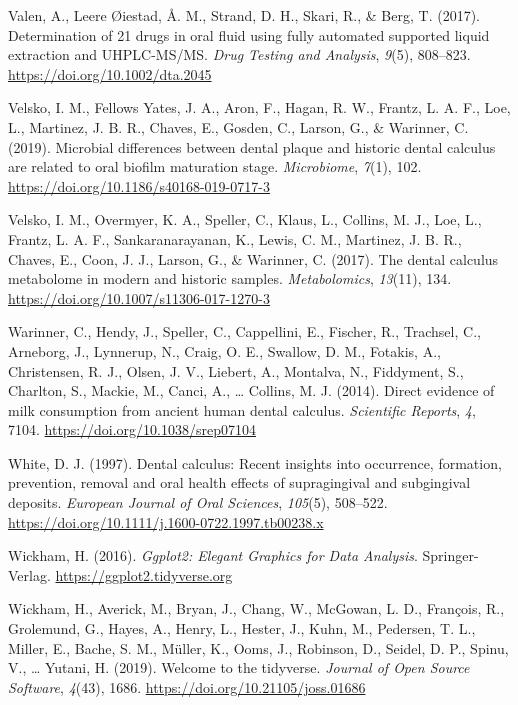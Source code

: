 \documentclass[
  11pt,
  leqno]{scrartcl}
\newlength{\cslhangindent}
\newenvironment{CSLReferences}[2] %
 {\begin{list}{}{%
  \setlength{\itemindent}{0pt}
  \setlength{\leftmargin}{0pt}
  \setlength{\parsep}{0pt}
  \ifodd #1
   \setlength{\leftmargin}{\cslhangindent}
   \setlength{\itemindent}{-1\cslhangindent}
  \fi
  \setlength{\itemsep}{#2\baselineskip}}}
 {\end{list}}
\begin{document}
\begin{CSLReferences}{1}{0}
Valen, A., Leere Øiestad, Å. M., Strand, D. H., Skari, R., \& Berg, T.
(2017). Determination of 21 drugs in oral fluid using fully automated
supported liquid extraction and {UHPLC-MS}/{MS}. \emph{Drug Testing and
Analysis}, \emph{9}(5), 808--823. \url{https://doi.org/10.1002/dta.2045}

Velsko, I. M., Fellows Yates, J. A., Aron, F., Hagan, R. W., Frantz, L.
A. F., Loe, L., Martinez, J. B. R., Chaves, E., Gosden, C., Larson, G.,
\& Warinner, C. (2019). Microbial differences between dental plaque and
historic dental calculus are related to oral biofilm maturation stage.
\emph{Microbiome}, \emph{7}(1), 102.
\url{https://doi.org/10.1186/s40168-019-0717-3}

Velsko, I. M., Overmyer, K. A., Speller, C., Klaus, L., Collins, M. J.,
Loe, L., Frantz, L. A. F., Sankaranarayanan, K., Lewis, C. M., Martinez,
J. B. R., Chaves, E., Coon, J. J., Larson, G., \& Warinner, C. (2017).
The dental calculus metabolome in modern and historic samples.
\emph{Metabolomics}, \emph{13}(11), 134.
\url{https://doi.org/10.1007/s11306-017-1270-3}

Warinner, C., Hendy, J., Speller, C., Cappellini, E., Fischer, R.,
Trachsel, C., Arneborg, J., Lynnerup, N., Craig, O. E., Swallow, D. M.,
Fotakis, A., Christensen, R. J., Olsen, J. V., Liebert, A., Montalva,
N., Fiddyment, S., Charlton, S., Mackie, M., Canci, A., \ldots{}
Collins, M. J. (2014). Direct evidence of milk consumption from ancient
human dental calculus. \emph{Scientific Reports}, \emph{4}, 7104.
\url{https://doi.org/10.1038/srep07104}

White, D. J. (1997). Dental calculus: Recent insights into occurrence,
formation, prevention, removal and oral health effects of supragingival
and subgingival deposits. \emph{European Journal of Oral Sciences},
\emph{105}(5), 508--522.
\url{https://doi.org/10.1111/j.1600-0722.1997.tb00238.x}

Wickham, H. (2016). \emph{Ggplot2: {Elegant Graphics} for {Data
Analysis}}. {Springer-Verlag}. \url{https://ggplot2.tidyverse.org}

Wickham, H., Averick, M., Bryan, J., Chang, W., McGowan, L. D.,
François, R., Grolemund, G., Hayes, A., Henry, L., Hester, J., Kuhn, M.,
Pedersen, T. L., Miller, E., Bache, S. M., Müller, K., Ooms, J.,
Robinson, D., Seidel, D. P., Spinu, V., \ldots{} Yutani, H. (2019).
Welcome to the {tidyverse}. \emph{Journal of Open Source Software},
\emph{4}(43), 1686. \url{https://doi.org/10.21105/joss.01686}


\end{CSLReferences}
\end{document}
